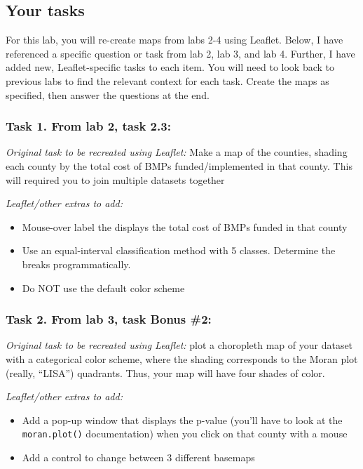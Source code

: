 \documentclass[]{article}
\begin{document}
\hypertarget{your-tasks}{%
\subsection{Your tasks}\label{your-tasks}}

For this lab, you will re-create maps from labs 2-4 using Leaflet.
Below, I have referenced a specific question or task from lab 2, lab 3,
and lab 4. Further, I have added new, Leaflet-specific tasks to each
item. You will need to look back to previous labs to find the relevant
context for each task. Create the maps as specified, then answer the
questions at the end.

\hypertarget{task-1.-from-lab-2-task-2.3}{%
\subsubsection{Task 1. From lab 2, task
2.3:}\label{task-1.-from-lab-2-task-2.3}}

\emph{Original task to be recreated using Leaflet:} Make a map of the
counties, shading each county by the total cost of BMPs
funded/implemented in that county. This will required you to join
multiple datasets together

\emph{Leaflet/other extras to add:}

\begin{itemize}
\item
  Mouse-over label the displays the total cost of BMPs funded in that
  county
\item
  Use an equal-interval classification method with 5 classes. Determine
  the breaks programmatically.
\item
  Do NOT use the default color scheme
\end{itemize}

\hypertarget{task-2.-from-lab-3-task-bonus-2}{%
\subsubsection{Task 2. From lab 3, task Bonus
\#2:}\label{task-2.-from-lab-3-task-bonus-2}}

\emph{Original task to be recreated using Leaflet:} plot a choropleth
map of your dataset with a categorical color scheme, where the shading
corresponds to the Moran plot (really, ``LISA'') quadrants. Thus, your
map will have four shades of color.

\emph{Leaflet/other extras to add:}

\begin{itemize}
\item
  Add a pop-up window that displays the p-value (you'll have to look at
  the \texttt{moran.plot()} documentation) when you click on that county
  with a mouse
\item
  Add a control to change between 3 different basemaps
\end{itemize}
\end{document}
